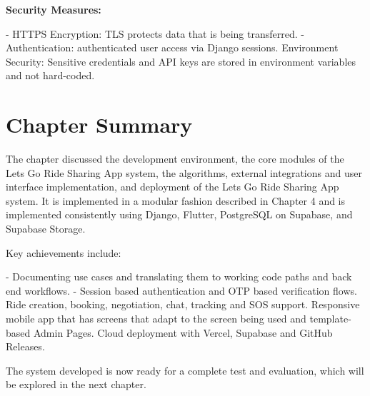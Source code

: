 \textbf{Security Measures:}

- HTTPS Encryption: TLS protects data that is being transferred.
- Authentication: authenticated user access via Django sessions.
Environment Security: Sensitive credentials and API keys are stored in environment variables and not hard-coded.


\section*{Chapter Summary}

The chapter discussed the development environment, the core modules of the Lets Go Ride Sharing App system, the algorithms, external integrations and user interface implementation, and deployment of the Lets Go Ride Sharing App system. It is implemented in a modular fashion described in Chapter 4 and is implemented consistently using Django, Flutter, PostgreSQL on Supabase, and Supabase Storage.

Key achievements include:

- Documenting use cases and translating them to working code paths and back end workflows.
- Session based authentication and OTP based verification flows.
Ride creation, booking, negotiation, chat, tracking and SOS support.
Responsive mobile app that has screens that adapt to the screen being used and template-based Admin Pages.
Cloud deployment with Vercel, Supabase and GitHub Releases.

The system developed is now ready for a complete test and evaluation, which will be explored in the next chapter.
